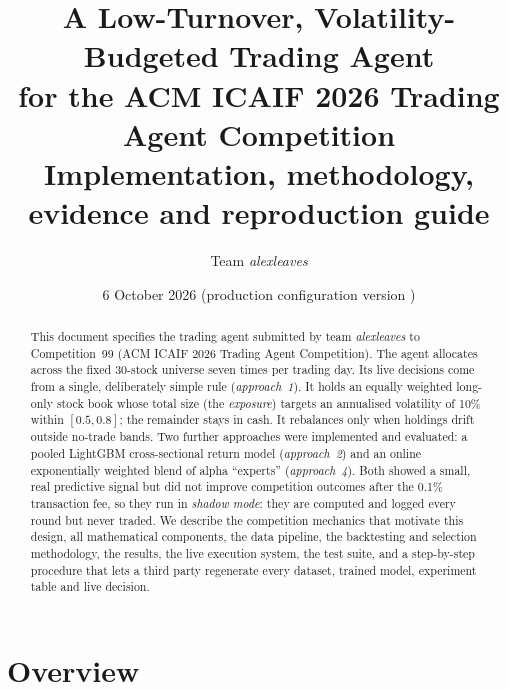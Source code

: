 \documentclass[11pt,a4paper]{article}
\title{A Low-Turnover, Volatility-Budgeted Trading Agent\\for the ACM ICAIF 2026 Trading Agent Competition\\[0.4em]
\large Implementation, methodology, evidence and reproduction guide}
\author{Team \emph{alexleaves}}
\date{6 October 2026 \quad (production configuration version \code{2026-10-06.1})}
\begin{document}
\maketitle

\begin{abstract}
\noindent
This document specifies the trading agent submitted by team \emph{alexleaves} to Competition~99 (ACM ICAIF 2026
Trading Agent Competition). The agent allocates across the fixed 30-stock universe seven times per trading day.
Its live decisions come from a single, deliberately simple rule (\emph{approach~1}). It holds an equally weighted
long-only stock book whose total size (the \emph{exposure}) targets an annualised volatility of 10\% within
$[0.5,0.8]$; the remainder stays in cash. It rebalances only when holdings drift outside no-trade bands.
Two further approaches were implemented and evaluated: a pooled LightGBM cross-sectional return model
(\emph{approach~2}) and an online exponentially weighted blend of alpha ``experts'' (\emph{approach~4}). Both
showed a small, real predictive signal but did not improve competition outcomes after the 0.1\% transaction fee,
so they run in \emph{shadow mode}: they are computed and logged every round but never traded. We describe the competition
mechanics that motivate this design, all mathematical components, the data pipeline, the backtesting and selection
methodology, the results, the live execution system, the test suite, and a step-by-step procedure that lets a third
party regenerate every dataset, trained model, experiment table and live decision.
\end{abstract}

\tableofcontents
\newpage

\section{Overview}
\end{document}
